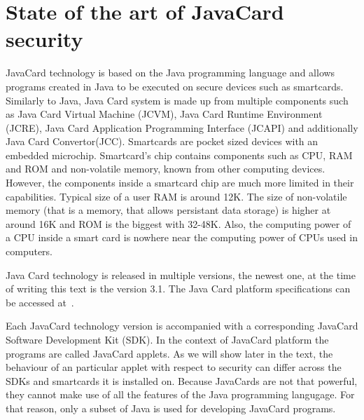 \documentclass{../llncs/llncs}
\begin{document}
\section{State of the art of JavaCard security\label{sec:state-of-the-art}}
JavaCard technology is based on the Java programming language and allows programs created in Java to be executed on secure devices such as smartcards. Similarly to Java, Java Card system is made up from multiple components such as Java Card Virtual Machine (JCVM), Java Card Runtime Environment (JCRE), Java Card Application Programming Interface (JCAPI) and additionally Java Card Convertor(JCC).  Smartcards are pocket sized devices with an embedded microchip. Smartcard's chip contains components such as CPU, RAM and ROM and non-volatile memory, known from other computing devices. However, the components inside a smartcard chip are much more limited in their capabilities. Typical size of a user RAM is around 12K. The size of non-volatile memory (that is a memory, that allows persistant data storage) is higher at around 16K and ROM is the biggest with 32-48K. Also, the computing power of a CPU inside a smart card is nowhere near the computing power of CPUs used in computers.

Java Card technology is released in multiple versions, the newest one, at the time of writing this text is the version 3.1. The Java Card platform specifications can be accessed at~\cite{jcspecs31download}.


Each JavaCard technology version is accompanied with a corresponding JavaCard Software Development Kit (SDK).
In the context of JavaCard platform the programs are called JavaCard applets. As we will show later in the text, the behaviour of an particular applet with respect to security can differ across the SDKs and smartcards it is installed on.
Because JavaCards are not that powerful, they cannot make use of all the features of the Java programming langugage. For that reason, only a subset of Java is used for developing JavaCard programs.
\end{document}
